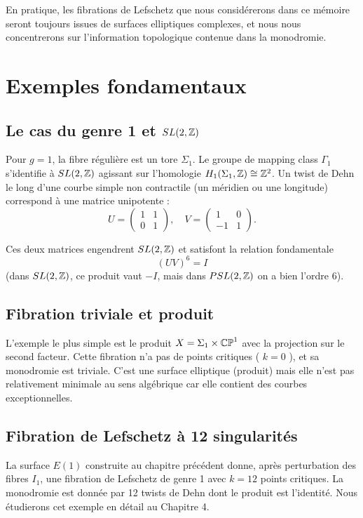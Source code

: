 En pratique, les fibrations de Lefschetz que nous considérerons dans ce mémoire seront toujours issues de surfaces elliptiques complexes, et nous nous concentrerons sur l'information topologique contenue dans la monodromie.

\section{Exemples fondamentaux}

\subsection{Le cas du genre 1 et $SL(2,\mathbb{Z})$}

Pour $g=1$, la fibre régulière est un tore $\Sigma_1$. Le groupe de mapping class $\Gamma_1$ s'identifie à $SL(2,\mathbb{Z})$ agissant sur l'homologie $H_1(\Sigma_1, \mathbb{Z}) \cong \mathbb{Z}^2$. Un twist de Dehn le long d'une courbe simple non contractile (un méridien ou une longitude) correspond à une matrice unipotente :
\[
U = \begin{pmatrix} 1 & 1 \\ 0 & 1 \end{pmatrix}, \quad V = \begin{pmatrix} 1 & 0 \\ -1 & 1 \end{pmatrix}.
\]

Ces deux matrices engendrent $SL(2,\mathbb{Z})$ et satisfont la relation fondamentale
\[
(UV)^6 = I
\]
(dans $SL(2,\mathbb{Z})$, ce produit vaut $-I$, mais dans $PSL(2,\mathbb{Z})$ on a bien l'ordre 6).

\subsection{Fibration triviale et produit}

L'exemple le plus simple est le produit $X = \Sigma_1 \times \mathbb{CP}^1$ avec la projection sur le second facteur. Cette fibration n'a pas de points critiques ( $k=0$ ), et sa monodromie est triviale. C'est une surface elliptique (produit) mais elle n'est pas relativement minimale au sens algébrique car elle contient des courbes exceptionnelles.

\subsection{Fibration de Lefschetz à 12 singularités}

La surface $E(1)$ construite au chapitre précédent donne, après perturbation des fibres $I_1$, une fibration de Lefschetz de genre 1 avec $k=12$ points critiques. La monodromie est donnée par 12 twists de Dehn dont le produit est l'identité. Nous étudierons cet exemple en détail au Chapitre 4.


